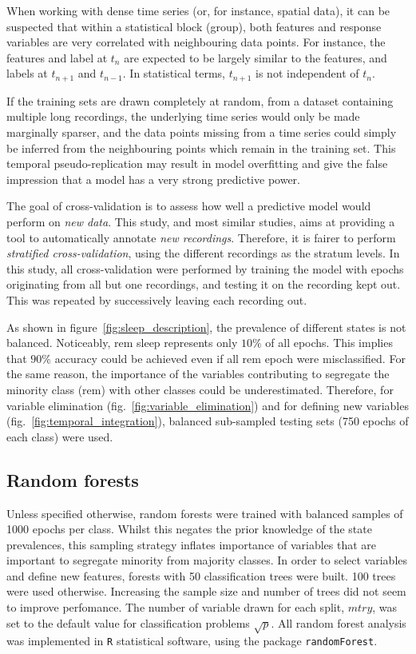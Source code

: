 When working with dense time series (or, for instance, spatial data), it can be suspected that within a statistical block (group),
both features and response variables are very correlated with neighbouring data points.
For instance, the features and label at $t_n$ are expected to be largely similar to the features, and labels at $t_{n+1}$ and $t_{n-1}$.
In statistical terms, $t_{n+1}$ is not independent of $t_{n}$.

If the training sets are drawn completely at random, from a dataset containing multiple long recordings,
the underlying time series would only be made marginally sparser, and the data points missing from
a time series could simply be inferred from the neighbouring points which remain in the training set.
This temporal pseudo-replication may result in model overfitting and give the false impression 
that a model has a very strong predictive power.

The goal of cross-validation is to assess how well a predictive model would perform on \emph{new data}.
This study, and most similar studies, aims at providing a tool to automatically annotate \emph{new recordings}.
Therefore, it is fairer to perform \emph{stratified cross-validation}, using the different recordings as the stratum levels.
In this study, all cross-validation were performed by training the model with epochs originating from all but one recordings,
and testing it on the recording kept out. This was repeated by successively leaving each recording out.

As shown in figure~\ref{fig:sleep_description}, the prevalence of different states is not balanced. Noticeably, \gls{rem} sleep represents only $10\%$ of all epochs.
This implies that $90\%$ accuracy could be achieved even if all \gls{rem} epoch were misclassified.
For the same reason, the importance of the variables contributing to segregate the minority class (\gls{rem}) with other classes could be underestimated.
Therefore, for variable elimination (fig.~\ref{fig:variable_elimination}) and for defining new variables (fig.~\ref{fig:temporal_integration}),
balanced sub-sampled testing sets (750 epochs of each class) were used.

\subsection{Random forests}
Unless specified otherwise, random forests \citationneeded{} were trained with balanced samples of 1000 epochs per class.
Whilst this negates the prior knowledge of the state prevalences, this sampling strategy 
inflates importance of variables that are important to segregate minority from majority classes.
In order to select variables and define new features, forests with 50 classification trees were built. 
100 trees were used otherwise.
Increasing the sample size and number of trees did not seem to improve perfomance.
The number of variable drawn for each split, $mtry$, was set to the default value  for classification problems $\sqrt{p}$.
All random forest analysis was implemented in \texttt{R}\citationneeded{} statistical software, using the package \texttt{randomForest}.


